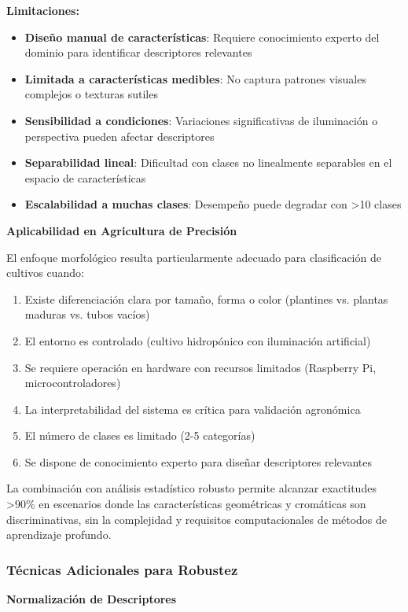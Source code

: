 \textbf{Limitaciones:}
\begin{itemize}
\item \textbf{Diseño manual de características}: Requiere conocimiento experto del dominio para identificar descriptores relevantes
\item \textbf{Limitada a características medibles}: No captura patrones visuales complejos o texturas sutiles
\item \textbf{Sensibilidad a condiciones}: Variaciones significativas de iluminación o perspectiva pueden afectar descriptores
\item \textbf{Separabilidad lineal}: Dificultad con clases no linealmente separables en el espacio de características
\item \textbf{Escalabilidad a muchas clases}: Desempeño puede degradar con >10 clases
\end{itemize}

\textbf{Aplicabilidad en Agricultura de Precisión}

El enfoque morfológico resulta particularmente adecuado para clasificación de cultivos cuando:
\begin{enumerate}
\item Existe diferenciación clara por tamaño, forma o color (plantines vs. plantas maduras vs. tubos vacíos)
\item El entorno es controlado (cultivo hidropónico con iluminación artificial)
\item Se requiere operación en hardware con recursos limitados (Raspberry Pi, microcontroladores)
\item La interpretabilidad del sistema es crítica para validación agronómica
\item El número de clases es limitado (2-5 categorías)
\item Se dispone de conocimiento experto para diseñar descriptores relevantes
\end{enumerate}

La combinación con análisis estadístico robusto permite alcanzar exactitudes >90\% en escenarios donde las características geométricas y cromáticas son discriminativas, sin la complejidad y requisitos computacionales de métodos de aprendizaje profundo.

\subsubsection{Técnicas Adicionales para Robustez}

\textbf{Normalización de Descriptores}


